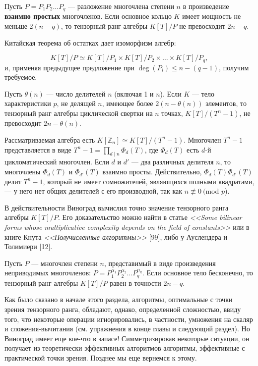\documentclass{mai_book}
\begin{document}
\begin{sled}
  Пусть $P = P_1P_2 \ldots P_q$ --- разложение многочлена степени $n$ в произведение \textbf{\textup{взаимно простых}} многочленов. Если основное кольцо $K$ имеет мощность не меньше $2(n - q)$, то тензорный ранг алгебры $K[T]/P$ не превосходит $2n - q$.
  \end{sled}
\begin{myproof}
Китайская теорема об остатках дает изоморфизм алгебр:\par
$$K[T]/P \simeq K[T]/P_1 \times K[T]/P_2 \times \ldots \times K[T]/P_q,$$\noindent
и, применяя предыдущее предложение при $ \deg (P_i) \leqslant n - (q - 1)$, получим требуемое.
\end{myproof}
\begin{sled}
  Пусть $\theta (n)$ --- число делителей $n$ (включая 1 и $n$). Если $K$ --- тело характеристики $p$, не делящей $n$, имеющее более $2(n - \theta (n))$ элементов, то тензорный ранг алгебры циклической свертки на $n$ точках, $K[T]/(T^n - 1)$, не превосходит $2n - \theta (n)$.
    \end{sled}
\begin{myproof}
  Рассматриваемая алгебра есть $K[\mathbb{Z}_n] \simeq K[T]/(T^n - 1)$. Многочлен $T^n - 1$ представляется в виде $T^n - 1 = \prod_{d \mid n} \Phi_d(T)$, где $\Phi_d(T)$ есть $d$-й цикломатический многочлен. Если $d$ и $d'$ --- два различных делителя $n$, то многочлены $\Phi_d(T)$ и $\Phi_{d'}(T)$ взаимно просты. Действительно, $\Phi_d(T)\Phi_{d'}(T)$ делит $T^n - 1$, который не имеет сомножителей, являющихся полными квадратами, --- у него нет общих делителей с его производной, так как $n \not\equiv 0\ ($mod $p$).
  \end{myproof}
В действительности Виноград вычислил точно значение тензорного ранга алгебры $K[T]/P$. Его доказательство можно найти в статье \textit{<<Some bilinear forms whose multiplicative complexity depends on the field of constants>>} или в книге Кнута \textit{<<Получисленные алгоритмы>>} [99], либо у Ауслендера и Толимиери [12].\par
\begin{thm}[Виноград]
  Пусть $P$ --- многочлен степени $n$, представимый в виде произведения неприводимых многочленов: $P = P^{\alpha_1}_1P^{\alpha_2}_2 \ldots P^{\alpha_q}_q$. Если основное тело бесконечно, то тензорный ранг алгебры $K[T]/P$ равен в точности $2n - q$.
  \end{thm}
Как было сказано в начале этого раздела, алгоритмы, оптимальные с точки зрения тензорного ранга, обладают, однако, определенной сложностью, ввиду того, что некоторые операции игнорировались, в частности, умножения на скаляр и сложения-вычитания (см. упражнения в конце главы и следующий раздел). Но Виноград имеет еще кое-что в запасе! Симметризировав некоторые ситуации, он получает из теоретически эффективных алгоритмов алгоритмы, эффективные с практической точки зрения. Позднее мы еще вернемся к этому.
\end{document}

